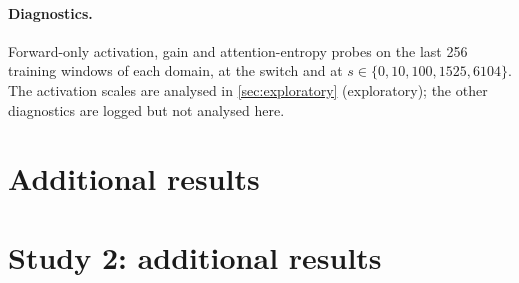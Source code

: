 \documentclass[11pt]{article}
\begin{document}
\paragraph{Diagnostics.} Forward-only activation, gain and attention-entropy probes on the last 256 training
windows of each domain, at the switch and at $s \in \{0, 10, 100, 1525, 6104\}$. The activation scales are
analysed in \cref{sec:exploratory} (exploratory); the other diagnostics are logged but not analysed here.

\section{Additional results}
\label{app:extra}

\begin{table}[H]
\centering
\small
\caption{Matched-adaptation differential forgetting (nats/token) and the interpolated Taper-minus continuation
update $s$ at which it reached each RMS code-CE target, with the observed bracket in parentheses.}

\end{table}

\begin{table}[H]
\centering
\small
\caption{Decomposition of the endpoint $D$ (nats/token) into disjoint token classes (each class's contribution
weighted by its label share; the four contributions sum to $D$), and summaries of per-document effects $D_i$ over
the \nDocsWeb{} web development documents. ``Top-1\% sum'' is the signed contribution of the 1\% of documents
with the largest positive contributions.}

\end{table}

\begin{table}[H]
\centering
\small
\caption{Rare-token flag R (pre-specified; overlaps the four classes) and the exploratory document bootstrap of
the endpoint $D$ (\bootB{} replicates, documents resampled jointly across arms and seeds; conditional on the
trained models).}

\end{table}

\section{Study 2: additional results}
\label{app:s2extra}

\begin{table}[H]
\centering
\small
\caption{Study 2, web $\to$ Chinese: decomposition of the endpoint $D_X$ (nats/token) into disjoint token classes
(the four contributions sum to $D_X$), summaries of per-document effects $D_i$ over the \nDocsWeb{} web development
documents, and the contribution of the overlapping rare-token flag R.}

\end{table}
\end{document}
